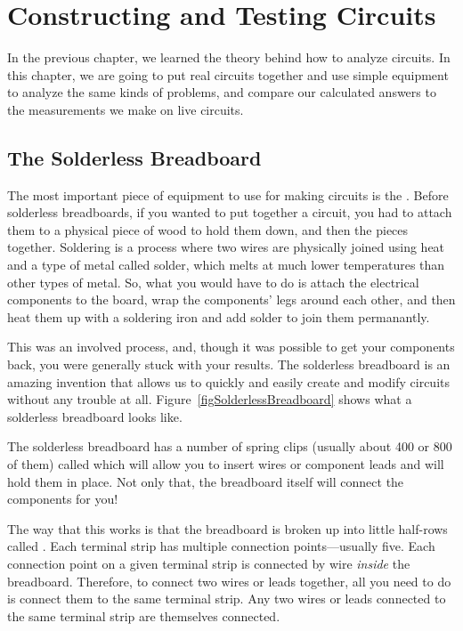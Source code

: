 \chapter{Constructing and Testing Circuits}

In the previous chapter, we learned the theory behind how to analyze circuits.
In this chapter, we are going to put real circuits together and use simple equipment to analyze the same kinds of problems, and compare our calculated answers to the measurements we make on live circuits.

\section{The Solderless Breadboard}

The most important piece of equipment to use for making circuits is the .
Before solderless breadboards, if you wanted to put together a circuit, you had to attach them to a physical piece of wood to hold them down, and then  the pieces together.
Soldering is a process where two wires are physically joined using heat and a type of metal called solder, which melts at much lower temperatures than other types of metal.
So, what you would have to do is attach the electrical components to the board, wrap the components' legs around each other, and then heat them up with a soldering iron and add solder to join them permanantly.

This was an involved process, and, though it was possible to get your components back, you were generally stuck with your results.
The solderless breadboard is an amazing invention that allows us to quickly and easily create and modify circuits without any trouble at all.
Figure~\ref{figSolderlessBreadboard} shows what a solderless breadboard looks like.


The solderless breadboard has a number of spring clips (usually about 400 or 800 of them) called  which will allow you to insert wires or component leads and will hold them in place.
Not only that, the breadboard itself will connect the components for you!

The way that this works is that the breadboard is broken up into little half-rows called .
Each terminal strip has multiple connection points---usually five.
Each connection point on a given terminal strip is connected by wire \emph{inside} the breadboard.
Therefore, to connect two wires or leads together, all you need to do is connect them to the same terminal strip.
Any two wires or leads connected to the same terminal strip are themselves connected.

